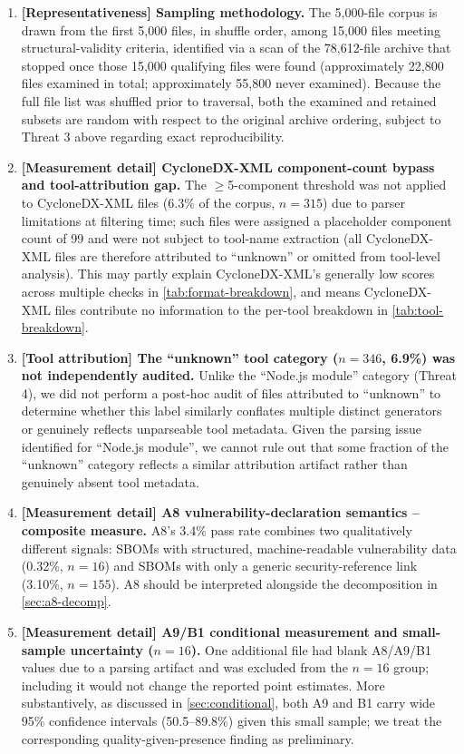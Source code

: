 \documentclass[11pt]{article}
\begin{document}
\begin{enumerate}[label=\arabic*.,leftmargin=*]
\item \textbf{[Representativeness] Sampling methodology.} The 5,000-file corpus is drawn from the first 5,000 files, in shuffle order, among 15,000 files meeting structural-validity criteria, identified via a scan of the 78,612-file archive that stopped once those 15,000 qualifying files were found (approximately 22,800 files examined in total; approximately 55,800 never examined). Because the full file list was shuffled prior to traversal, both the examined and retained subsets are random with respect to the original archive ordering, subject to Threat 3 above regarding exact reproducibility.

\item \textbf{[Measurement detail] CycloneDX-XML component-count bypass and tool-attribution gap.} The $\geq$5-component threshold was not applied to CycloneDX-XML files (6.3\% of the corpus, $n=315$) due to parser limitations at filtering time; such files were assigned a placeholder component count of 99 and were not subject to tool-name extraction (all CycloneDX-XML files are therefore attributed to ``unknown'' or omitted from tool-level analysis). This may partly explain CycloneDX-XML's generally low scores across multiple checks in \cref{tab:format-breakdown}, and means CycloneDX-XML files contribute no information to the per-tool breakdown in \cref{tab:tool-breakdown}.

\item \textbf{[Tool attribution] The ``unknown'' tool category ($n=346$, 6.9\%) was not independently audited.} Unlike the ``Node.js module'' category (Threat 4), we did not perform a post-hoc audit of files attributed to ``unknown'' to determine whether this label similarly conflates multiple distinct generators or genuinely reflects unparseable tool metadata. Given the parsing issue identified for ``Node.js module'', we cannot rule out that some fraction of the ``unknown'' category reflects a similar attribution artifact rather than genuinely absent tool metadata.

\item \textbf{[Measurement detail] A8 vulnerability-declaration semantics -- composite measure.} A8's 3.4\% pass rate combines two qualitatively different signals: SBOMs with structured, machine-readable vulnerability data (0.32\%, $n=16$) and SBOMs with only a generic security-reference link (3.10\%, $n=155$). A8 should be interpreted alongside the decomposition in \cref{sec:a8-decomp}.

\item \textbf{[Measurement detail] A9/B1 conditional measurement and small-sample uncertainty ($n=16$).} One additional file had blank A8/A9/B1 values due to a parsing artifact and was excluded from the $n=16$ group; including it would not change the reported point estimates. More substantively, as discussed in \cref{sec:conditional}, both A9 and B1 carry wide 95\% confidence intervals (50.5--89.8\%) given this small sample; we treat the corresponding quality-given-presence finding as preliminary.


\end{enumerate}
\end{document}

